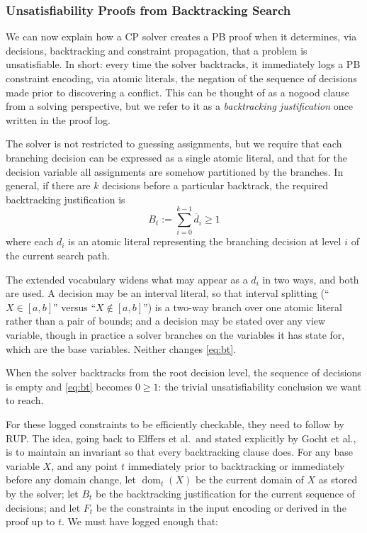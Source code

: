 \documentclass[11pt,a4paper]{article}
\theoremstyle{plain}
\theoremstyle{definition}
\theoremstyle{remark}
\newcommand{\fname}[1]{\ensuremath{\operatorname{#1}}}
\newcommand{\dm}{\fname{dom}}
\begin{document}
\subsubsection{Unsatisfiability Proofs from Backtracking Search}
\label{sec:unsat}

We can now explain how a CP solver creates a PB proof when it determines, via
decisions, backtracking and constraint propagation, that a problem is
unsatisfiable.  In short: every time the solver backtracks, it immediately logs
a PB constraint encoding, via atomic literals, the negation of the sequence of
decisions made prior to discovering a conflict.  This can be thought of as a
nogood clause from a solving perspective, but we refer to it as a
\emph{backtracking justification} once written in the proof log.

The solver is not restricted to guessing assignments, but we require that each
branching decision can be expressed as a single atomic literal, and that for the
decision variable all assignments are somehow partitioned by the branches.  In
general, if there are $k$ decisions before a particular backtrack, the required
backtracking justification is
\begin{equation}
  B_t := \sum_{i=0}^{k-1}\overline{d}_i \geq 1
  \label{eq:bt}
\end{equation}
where each $d_i$ is an atomic literal representing the branching decision at
level $i$ of the current search path.

The extended vocabulary widens what may appear as a $d_i$ in two ways, and both
are used.  A decision may be an interval literal, so that interval splitting
(``$X\in[a,b]$'' versus ``$X\notin[a,b]$'') is a two-way branch over one atomic
literal rather than a pair of bounds; and a decision may be stated over any
view variable, though in practice a solver branches on the variables it has
state for, which are the base variables.  Neither changes \cref{eq:bt}.

When the solver backtracks from the root decision level, the sequence of
decisions is empty and \cref{eq:bt} becomes $0\geq 1$: the trivial
unsatisfiability conclusion we want to reach.

For these logged constraints to be efficiently checkable, they need to follow
by RUP.  The idea, going back to Elffers et al.\ and stated explicitly by Gocht
et al., is to maintain an invariant so that every backtracking clause does.  For
any base variable $X$, and any point $t$ immediately prior to backtracking or
immediately before any domain change, let $\dm_t(X)$ be the current domain of
$X$ as stored by the solver; let $B_t$ be the backtracking justification for the
current sequence of decisions; and let $F_t$ be the constraints in the input
encoding or derived in the proof up to $t$.  We must have logged enough that:
\end{document}
